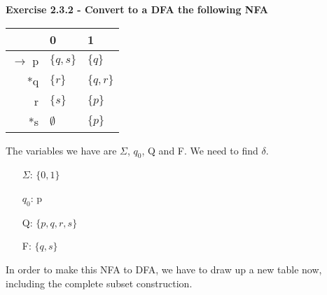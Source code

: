 \documentclass{article}
\theoremstyle{theorem}
\theoremstyle{definition}
\theoremstyle{remark}
\begin{document}
\textbf{Exercise 2.3.2 - Convert to a DFA the following NFA}

\begin{table}[h!] %
\centering
\begin{tabular}{r||l|l}
    & 0 & 1 \\
    \hline
    $\rightarrow$ p & $\{q,s\}$ & $\{q\}$ \\
    *q & $\{r\}$ & $\{q,r\}$ \\
    r & $\{s\}$ & $\{p\}$ \\
    *s & $\emptyset$ & $\{p\}$
\end{tabular}
\end{table}

The variables we have are $\Sigma$, $q_0$, Q and F. We need to find $\delta$.
\begin{enumerate}
    \item[$\Sigma$:] $\{0,1\}$
    \item[$q_0$:] p
    \item[Q:] $\{p,q,r,s\}$
    \item[F:] $\{q,s\}$
\end{enumerate}

In order to make this NFA to DFA, we have to draw up a new table now, including the complete subset construction.
\end{document}
